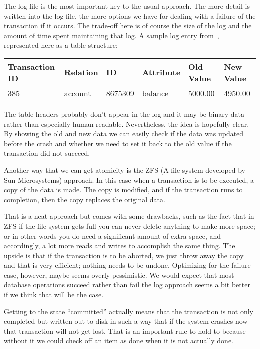 \documentclass[a4paper]{report}
\begin{document}
The log file is the most important key to the usual approach. The more detail is written into the log file, the more options we have for dealing with a failure of the transaction if it occurs. The trade-off here is of course the size of the log and the amount of time spent maintaining that log. A sample log entry from~\cite{dsc}, represented here as a table structure: 

\begin{center}
\begin{tabular}{|l|l|l|l|l|l|}\hline
	\textbf{Transaction ID} & \textbf{Relation} & \textbf{ID} & \textbf{Attribute} & \textbf{Old Value} & \textbf{New Value}\\ \hline
	385 & account & 8675309 & balance & 5000.00 & 4950.00 \\ \hline
\end{tabular}
\end{center}

The table headers probably don't appear in the log and it may be binary data rather than especially human-readable. Nevertheless, the idea is hopefully clear. By showing the old and new data we can easily check if the data was updated before the crash and whether we need to set it back to the old value if the transaction did not succeed. 

Another way that we can get atomicity is the ZFS (A file system developed by Sun Microsystems) approach. In this case when a transaction is to be executed, a copy of the data is made. The copy is modified, and if the transaction runs to completion, then the copy replaces the original data. 

That is a neat approach but comes with some drawbacks, such as the fact that in ZFS if the file system gets full you can never delete anything to make more space; or in other words you do need a significant amount of extra space, and accordingly, a lot more reads and writes to accomplish the same thing. The upside is that if the transaction is to be aborted, we just throw away the copy and that is very efficient; nothing needs to be undone. Optimizing for the failure case, however, maybe seems overly pessimistic. We would expect that most database operations succeed rather than fail the log approach seems a bit better if we think that will be the case.

Getting to the state ``committed'' actually means that the transaction is not only completed but written out to disk in such a way that if the system crashes now that transaction will not get lost. That is an important rule to hold to because without it we could check off an item as done when it is not actually done.
\end{document}
